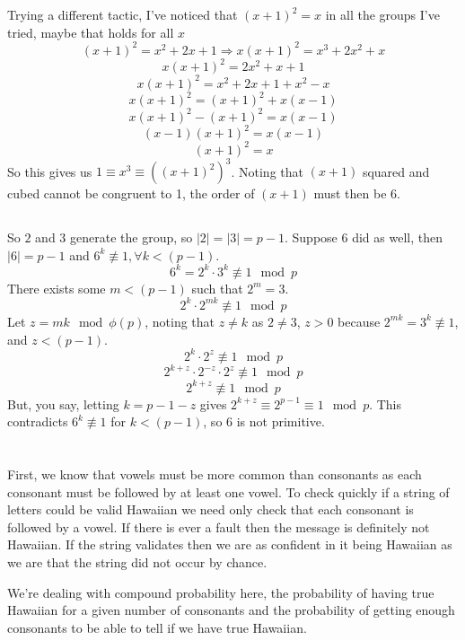\documentclass[]{article}
\begin{document}
Trying a different tactic, I've noticed that $(x+1)^2 = x$ in all the groups I've tried, maybe that holds for all $x$
$$(x+1)^2 = x^2 + 2x + 1 \Rightarrow x(x+1)^2 = x^3 + 2x^2 + x$$
$$x(x+1)^2 = 2x^2 + x + 1$$
$$x(x+1)^2= x^2 + 2x + 1 + x^2 - x$$
$$x(x+1)^2 = (x+1)^2 + x(x-1)$$
$$x(x+1)^2 - (x+1)^2 = x(x-1)$$
$$(x-1)(x+1)^2 = x(x-1)$$
$$(x+1)^2 = x$$
So this gives us $1 \equiv x^3 \equiv ((x+1)^2)^3$.  Noting that $(x+1)$ squared and cubed cannot be congruent to 1, the order of $(x+1)$ must then be 6.

\subsection{}
So $2$ and $3$ generate the group, so $|2| = |3| = p-1$.  Suppose $6$ did as well, then $|6| = p-1$ and $6^k \not\equiv 1, \forall k<(p-1)$.
$$6^k = 2^k\cdot3^k  \not\equiv 1 \mod p$$
There exists some $m < (p-1)$ such that $2^m = 3$.
$$2^k\cdot2^{mk}  \not\equiv 1 \mod p$$
Let $z = mk \mod \phi(p)$, noting that $z \neq k$ as $2 \neq 3$, $z > 0$ because $2^{mk} = 3^k \not\equiv 1$, and $z < (p-1)$.
$$2^k\cdot2^z \not\equiv 1 \mod p$$
$$2^{k+z}\cdot2^{-z}\cdot2^z \not\equiv 1 \mod p$$
$$2^{k+z} \not\equiv 1 \mod p$$
But, you say, letting $k = p - 1 - z$ gives $2^{k+z} \equiv 2^{p-1} \equiv 1 \mod p$.  This contradicts $6^k \not\equiv 1$ for $k<(p-1)$, so 6 is not primitive.



\section{}
First, we know that vowels must be more common than consonants as each consonant must be followed by at least one vowel. To check quickly if a string of letters could be valid Hawaiian we need only check that each consonant is followed by a vowel.  If there is ever a fault then the message is definitely not Hawaiian.  If the string validates then we are as confident in it being Hawaiian as we are that the string did not occur by chance.

We're dealing with compound probability here, the probability of having true Hawaiian for a given number of consonants and the probability of getting enough consonants to be able to tell if we have true Hawaiian. 
\end{document}
